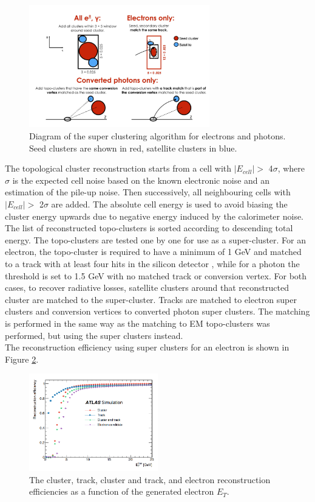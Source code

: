 \begin{figure}[htbp]
    \centering
    \includegraphics[width=0.7\textwidth]{Ch2/Img/Super_cluster.png}
    \caption{Diagram of the super clustering algorithm for electrons and photons. Seed clusters are shown in red, satellite clusters in blue.}
    \label{fig:chap2:Objetcs:Egamma:SC}
\end{figure}
The topological cluster reconstruction starts from a cell with $|E_{cell}|>$ 4$\sigma$, where $\sigma$ is the expected cell noise based on the known electronic noise and an estimation of the pile-up noise. Then successively, all neighbouring cells with $|E_{cell}|>$ 2$\sigma$ are added. The absolute cell energy is used to avoid biasing the cluster energy upwards due to negative energy induced by the calorimeter noise. The list of reconstructed topo-clusters is sorted according to descending total energy. The topo-clusters are tested one by one for use as a super-cluster. For an electron, the topo-cluster is required to have a minimum \eT of 1 GeV and matched to a track with at least four hits in the silicon detector \cite{GSF}, while for a photon the threshold is set to 1.5 GeV with no matched track or conversion vertex. For both cases, to recover radiative losses, satellite clusters around that reconstructed cluster are matched to the super-cluster. Tracks are matched to electron super clusters and conversion vertices to converted photon super clusters. The matching is performed in the same way as the matching to EM topo-clusters was performed, but using the super clusters instead. \\
The reconstruction efficiency using super clusters for an electron is shown in Figure \ref{fig:chap2:Objects:Egamma:El_Eff}.
\begin{figure}[htbp]
    \centering
    \includegraphics[width=0.5\textwidth]{Ch2/Img/Electron_Reco_Eff.png}
    \caption{The cluster, track, cluster and track, and electron reconstruction efficiencies as a function of the generated electron $E_T$.}
    \label{fig:chap2:Objects:Egamma:El_Eff}
\end{figure}
